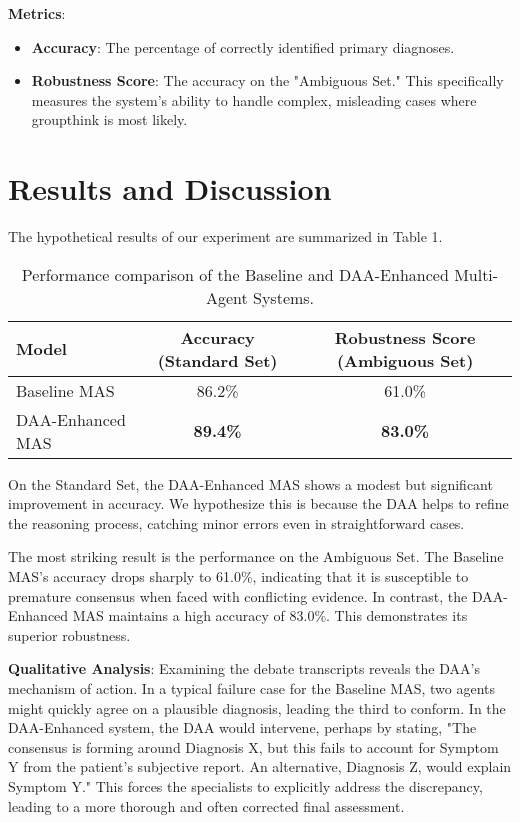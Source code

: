 \documentclass{article}
\begin{document}
\begin{enumerate}
\textbf{Metrics}:
\begin{itemize}
    \item \textbf{Accuracy}: The percentage of correctly identified primary diagnoses.
    \item \textbf{Robustness Score}: The accuracy on the "Ambiguous Set." This specifically measures the system's ability to handle complex, misleading cases where groupthink is most likely.
\end{itemize}

\section{Results and Discussion}

The hypothetical results of our experiment are summarized in Table 1.

\begin{table}[h!]
\centering
\begin{tabular}{|l|c|c|}
\hline
\textbf{Model} & \textbf{Accuracy (Standard Set)} & \textbf{Robustness Score (Ambiguous Set)} \\ \hline
Baseline MAS & 86.2\% & 61.0\% \\
DAA-Enhanced MAS & \textbf{89.4\%} & \textbf{83.0\%} \\ \hline
\end{tabular}
\caption{Performance comparison of the Baseline and DAA-Enhanced Multi-Agent Systems.}
\label{tab:results}
\end{table}

On the Standard Set, the DAA-Enhanced MAS shows a modest but significant improvement in accuracy. We hypothesize this is because the DAA helps to refine the reasoning process, catching minor errors even in straightforward cases.

The most striking result is the performance on the Ambiguous Set. The Baseline MAS's accuracy drops sharply to 61.0\%, indicating that it is susceptible to premature consensus when faced with conflicting evidence. In contrast, the DAA-Enhanced MAS maintains a high accuracy of 83.0\%. This demonstrates its superior robustness.

\textbf{Qualitative Analysis}: Examining the debate transcripts reveals the DAA's mechanism of action. In a typical failure case for the Baseline MAS, two agents might quickly agree on a plausible diagnosis, leading the third to conform. In the DAA-Enhanced system, the DAA would intervene, perhaps by stating, "The consensus is forming around Diagnosis X, but this fails to account for Symptom Y from the patient's subjective report. An alternative, Diagnosis Z, would explain Symptom Y." This forces the specialists to explicitly address the discrepancy, leading to a more thorough and often corrected final assessment.


\end{enumerate}
\end{document}
